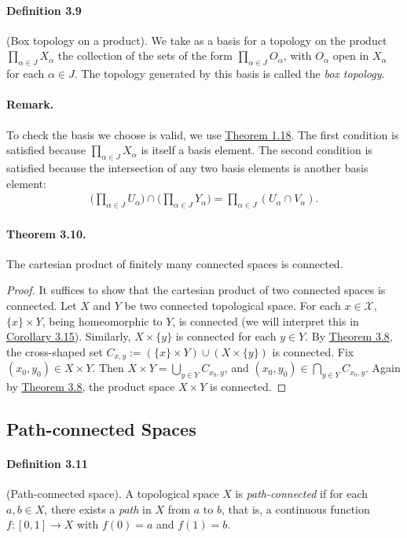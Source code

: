 \documentclass{article}
\numberwithin{equation}{section}
\theoremstyle{plain}
\theoremstyle{definition}
\begin{document}
\paragraph{Definition 3.9\label{def:3.9}} (Box topology on a product). We take as a basis for a topology on the product $\prod_{\alpha\in J}X_\alpha$ the collection of the sets of the form $\prod_{\alpha\in J}O_\alpha$, with $O_\alpha$ open in $X_\alpha$ for each $\alpha\in J$.  The topology generated by this basis is called the \textit{box topology}.

\paragraph{Remark.} To check the basis we choose is valid, we use \hyperref[thm:1.18]{Theorem 1.18}. The first condition is satisfied because 
$\prod_{\alpha\in J}X_\alpha$ is itself a basis element. The second condition is satisfied because the intersection of any two basis elements is another basis element:
\begin{align*}
	\biggl(\prod_{\alpha\in J}U_\alpha\biggr)\cap\biggl(\prod_{\alpha\in J}Y_\alpha\biggl) = \prod_{\alpha\in J}(U_\alpha\cap V_\alpha).
\end{align*}

\paragraph{Theorem 3.10.\label{thm:3.10}} The cartesian product of finitely many connected spaces is connected.
\begin{proof}
It suffices to show that the cartesian product of two connected spaces is connected. Let $X$ and $Y$ be two connected topological space. For each $x\in\mathcal{X}$, $\{x\}\times Y$, being homeomorphic to $Y$, is connected (we will interpret this in \hyperref[cor:3.15]{Corollary 3.15}). Similarly, $X\times\{y\}$ is connected for each $y\in Y$. By \hyperref[thm:3.8]{Theorem 3.8}, the cross-shaped set $C_{x,y}:=(\{x\}\times Y)\cup(X\times\{y\})$ is connected. Fix $(x_0,y_0)\in X\times Y$. Then $X\times Y = \bigcup_{y\in Y}C_{x_0,y}$, and $(x_0,y_0)\in\bigcap_{y\in Y}C_{x_0,y}$. Again by \hyperref[thm:3.8]{Theorem 3.8}, the product space $X\times Y$ is connected.
\end{proof}

\subsection{Path-connected Spaces}
\paragraph{Definition 3.11\label{def:3.11}} (Path-connected space). A topological space $X$ is \textit{path-connected} if for each $a,b\in X$, there exists a \textit{path} in $X$ from $a$ to $b$, that is, a continuous function $f:[0,1]\to X$ with $f(0)=a$ and $f(1)=b$.
\end{document}

